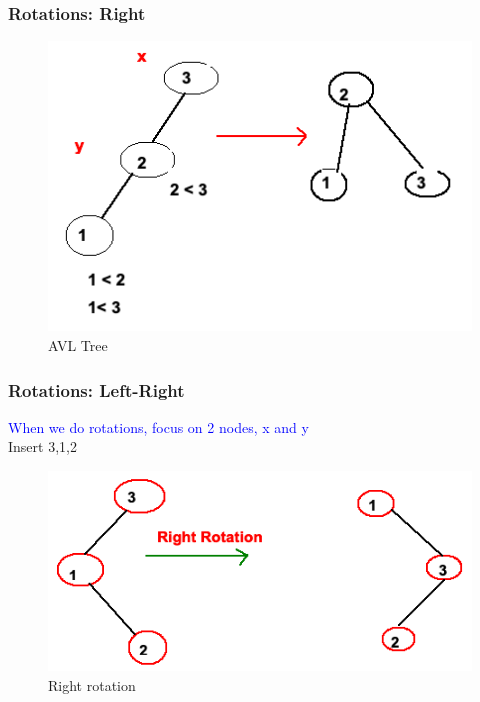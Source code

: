 \documentclass[11pt]{beamer}
\begin{document}
     \begin{frame}
     	\frametitle{Rotations: Right}
     	\begin{figure}
     		\centering
     		\includegraphics[width=0.8\linewidth]{"Screenshot 2020-11-24 at 10.26.23 AM"}
     		\caption{AVL Tree}
     		\label{fig:screenshot-2020-11-24-at-10}
     	\end{figure}	
     \end{frame}
 
       \begin{frame}
    	\frametitle{Rotations: Left-Right}
    	\textcolor{blue}{When we do rotations, focus on 2 nodes, x and y}\\
    	\alert{Insert 3,1,2}
    	\begin{figure}
    		\centering
    		\includegraphics[width=0.9\linewidth]{"Screenshot 2020-11-24 at 11.12.17 AM"}
    		\caption{Right rotation}
    		\label{fig:screenshot-2020-11-24-at-11}
    	\end{figure}   	
    \end{frame}	
\end{document}
